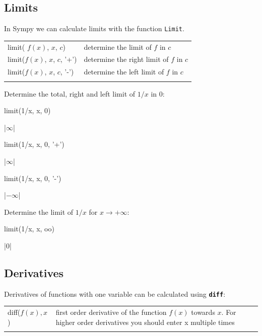 \subsection{Limits}
In Sympy we can calculate limits with the function \lstinline|Limit|.

\begin{tabular}{>{\hfill}p{8cm}p{9cm}}
	limit( $f(x)$, $x$, $c$)								&	determine the limit of $f$  in $c$\\
	limit($f (x)$, $x$, $c$, '+')		&	determine the right limit of $f$  in $c$ \\
	limit($f (x)$, $x$, $c$, '-')		&	determine the left limit of $f$  in $c$ \\
	\multicolumn{2}{l}{} 
\end{tabular}


\begin{example}
Determine the total, right and left limit of $1/x$ in $0$:
\begin{pyin}
    limit(1/x, x, 0)
\end{pyin}
\begin{pyout}
    |$\infty$|
\end{pyout}
\begin{pyin}
    limit(1/x, x, 0, '+')
\end{pyin}
\begin{pyout}
    |$\infty$|
\end{pyout}
\begin{pyin}
    limit(1/x, x, 0, '-')
\end{pyin}
\begin{pyout}
    |$-\infty$|
\end{pyout}

	Determine the limit of $1/x$ for $x \rightarrow +\infty$:
	
\begin{pyin}
    limit(1/x, x, oo)
\end{pyin}
\begin{pyout}
    |$0$|
\end{pyout}
\end{example}

\subsection{Derivatives}


Derivatives of functions with one variable can be calculated using \textbf{\lstinline|diff|}:\\

\begin{tabular}{>{\hfill}p{8cm}p{9cm}}
	diff($f(x), x$)			&			first order derivative of the function $f(x)$ towards $x$. For higher order derivatives you should enter x multiple times\\
	\multicolumn{2}{l}{} 
\end{tabular}


